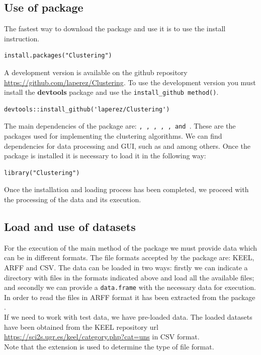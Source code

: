 \subsection{Use of  package}

The fastest way to download the  package and use it is to use the install instruction.

\begin{verbatim}
install.packages("Clustering")
\end{verbatim}
A development version is available on the github repository \url{https://github.com/laperez/Clustering}. To use the development version you must install the \textbf{devtools} package and use the \texttt{install\_github method()}.

\begin{verbatim}
devtools::install_github('laperez/Clustering')
\end{verbatim}
The main dependencies of the   package are: \texttt{, , , , ,  and }. These are the packages used for implementing the clustering algorithms. We can find dependencies for data processing and GUI, such as \texttt{} and \texttt{} among others. Once the package is installed it is necessary to load it in the following way:

\begin{verbatim}
library("Clustering")
\end{verbatim}
Once the installation and loading process has been completed, we proceed with the processing of the data and its execution.

\subsection {Load and use of datasets}

For the execution of the main method of the package we must provide data which can be in different formats. The file formats accepted by the package are: KEEL, ARFF and CSV. The data can be loaded in two ways: firstly we can indicate a directory with files in the formats indicated above and load all the available files; and secondly we can provide a \texttt{data.frame} with the necessary data for execution. In order to read the files in ARFF format it has been extracted from the  package \citep{b55}.\\
If we need to work with test data, we have pre-loaded data. The loaded datasets have been obtained from the KEEL repository url \url{https://sci2s.ugr.es/keel/category.php?cat=uns} in CSV format.\\
Note that the extension is used to determine the type of file format.

